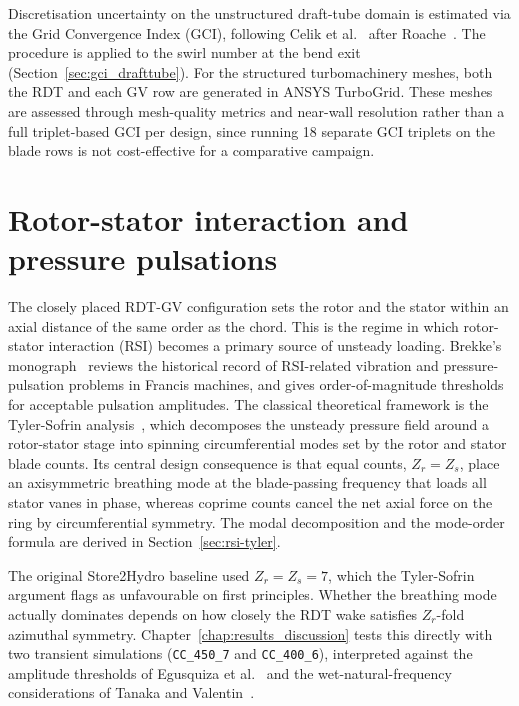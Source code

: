Discretisation uncertainty on the unstructured draft-tube domain is estimated via the Grid Convergence Index (GCI), following Celik et al.~\cite{Celik2008} after Roache~\cite{Roache1998}. The procedure is applied to the swirl number at the bend exit (Section~\ref{sec:gci_drafttube}). For the structured turbomachinery meshes, both the RDT and each GV row are generated in ANSYS TurboGrid. These meshes are assessed through mesh-quality metrics and near-wall resolution rather than a full triplet-based GCI per design, since running 18 separate GCI triplets on the blade rows is not cost-effective for a comparative campaign.
 
\section{Rotor-stator interaction and pressure pulsations}
\label{sec:lit_rsi}
 
The closely placed RDT-GV configuration sets the rotor and the stator within an axial distance of the same order as the chord. This is the regime in which rotor-stator interaction (RSI) becomes a primary source of unsteady loading. Brekke's monograph~\cite{Brekke2010, Brekke2001} reviews the historical record of RSI-related vibration and pressure-pulsation problems in Francis machines, and gives order-of-magnitude thresholds for acceptable pulsation amplitudes. The classical theoretical framework is the Tyler-Sofrin analysis~\cite{Tyler1962}, which decomposes the unsteady pressure field around a rotor-stator stage into spinning circumferential modes set by the rotor and stator blade counts. Its central design consequence is that equal counts, $Z_r = Z_s$, place an axisymmetric breathing mode at the blade-passing frequency that loads all stator vanes in phase, whereas coprime counts cancel the net axial force on the ring by circumferential symmetry. The modal decomposition and the mode-order formula are derived in Section~\ref{sec:rsi-tyler}.
 
The original Store2Hydro baseline used $Z_r = Z_s = 7$, which the Tyler-Sofrin argument flags as unfavourable on first principles. Whether the breathing mode actually dominates depends on how closely the RDT wake satisfies $Z_r$-fold azimuthal symmetry. Chapter~\ref{chap:results_discussion} tests this directly with two transient simulations (\texttt{CC\_450\_7} and \texttt{CC\_400\_6}), interpreted against the amplitude thresholds of Egusquiza et al.~\cite{Egusquiza2006} and the wet-natural-frequency considerations of Tanaka and Valentin~\cite{Tanaka2011, Valentin2015}.
 
